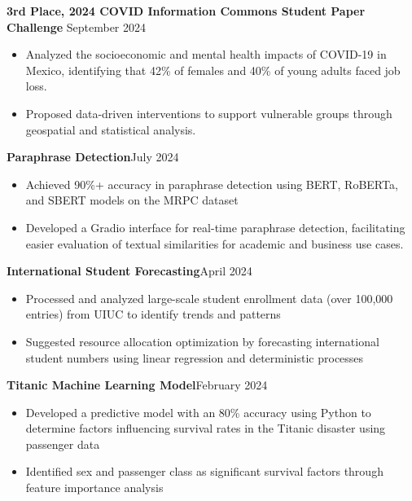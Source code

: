 \documentclass[a4paper]{article}
\begin{document}
\textbf{3rd Place, 2024 COVID Information Commons Student Paper Challenge} \hfill September 2024 \\
    \begin{itemize}[noitemsep]
        \item Analyzed the socioeconomic and mental health impacts of COVID-19 in Mexico, identifying that 42\% of females and 40\% of young adults faced job loss.
        \item Proposed data-driven interventions to support vulnerable groups through geospatial and statistical analysis.
    \end{itemize}

\textbf{Paraphrase Detection}\hfill{July 2024}\\
\begin{itemize}[nolistsep]
    \item Achieved 90\%+ accuracy in paraphrase detection using BERT, RoBERTa,
     and SBERT models on the MRPC dataset
    \item Developed a Gradio interface for real-time paraphrase detection, facilitating easier evaluation 
    of textual similarities for academic and business use cases.
\end{itemize}

\textbf{International Student Forecasting}\hfill{April 2024}\\
\begin{itemize}[nolistsep]
    \item Processed and analyzed large-scale student enrollment data 
    (over 100,000 entries) from UIUC to identify trends and patterns
    \item Suggested resource allocation optimization by forecasting 
    international student numbers using linear regression and deterministic processes
    \end{itemize}

\textbf{Titanic Machine Learning Model}\hfill{February 2024}\\
\begin{itemize}[nolistsep]
    \item Developed a predictive model with an 80\% accuracy using Python to 
    determine factors influencing survival 
    rates in the Titanic disaster using passenger data
    \item Identified sex and passenger class as significant 
    survival factors through feature importance analysis
    \end{itemize}
\end{document}
